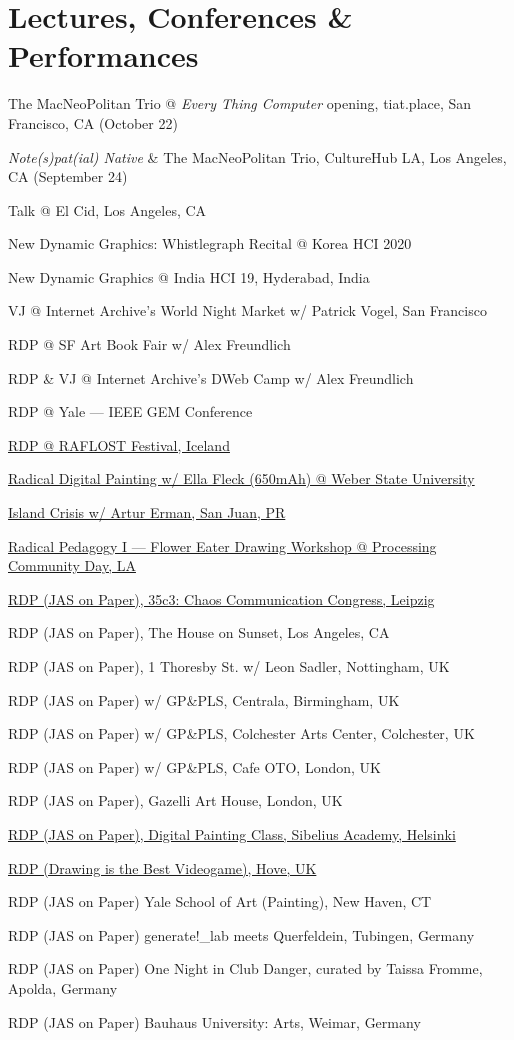 \documentclass[10pt,letterpaper]{article}
\newlength{\cvyearwidth}
\newenvironment{cvlist}{%
  \begin{list}{}{%
    \setlength{\leftmargin}{\cvyearwidth}%
    \setlength{\labelwidth}{\cvyearwidth}%
    \setlength{\labelsep}{0.4em}%
    \setlength{\itemsep}{0.15em}%
    \setlength{\parsep}{0pt}%
    \setlength{\topsep}{0.2em}%
    \renewcommand{\makelabel}[1]{\color{acgray}\small ##1\hfill}%
  }%
}{\end{list}}
\newcommand{\cv}[2]{\item[#1] #2}
\begin{document}
\section*{Lectures, Conferences \& Performances}
\begin{cvlist}
  \cv{2026}{The MacNeoPolitan Trio @ \emph{Every Thing Computer} opening, tiat.place, San Francisco, CA (October 22)}
  \cv{2026}{\emph{Note(s)pat(ial) Native} \& The MacNeoPolitan Trio, CultureHub LA, Los Angeles, CA (September 24)}
  \cv{2025}{Talk @ El Cid, Los Angeles, CA}

  \cv{2020}{New Dynamic Graphics: Whistlegraph Recital @ Korea HCI 2020}
  \cv{2019}{New Dynamic Graphics @ India HCI 19, Hyderabad, India}
  \cv{2019}{VJ @ Internet Archive's World Night Market w/ Patrick Vogel, San Francisco}
  \cv{2019}{RDP @ SF Art Book Fair w/ Alex Freundlich}
  \cv{2019}{RDP \& VJ @ Internet Archive's DWeb Camp w/ Alex Freundlich}
  \cv{2019}{RDP @ Yale --- IEEE GEM Conference}
  \cv{2019}{\href{http://www.raflost.is/jeffrey-alan-scudder}{RDP @ RAFLOST Festival, Iceland}}
  \cv{2019}{\href{https://www.youtube.com/watch?v=xZMsXPgg_9U}{Radical Digital Painting w/ Ella Fleck (650mAh) @ Weber State University}}
  \cv{2019}{\href{https://www.instagram.com/p/BtY342PFPpO}{Island Crisis w/ Artur Erman, San Juan, PR}}
  \cv{2019}{\href{https://day.processing.org/pcd-la-tracks.html}{Radical Pedagogy I --- Flower Eater Drawing Workshop @ Processing Community Day, LA}}
  \cv{2018}{\href{https://media.ccc.de/v/35c3-9774-radical_digital_painting}{RDP (JAS on Paper), 35c3: Chaos Communication Congress, Leipzig}}
  \cv{2018}{RDP (JAS on Paper), The House on Sunset, Los Angeles, CA}
  \cv{2018}{RDP (JAS on Paper), 1 Thoresby St. w/ Leon Sadler, Nottingham, UK}
  \cv{2018}{RDP (JAS on Paper) w/ GP\&PLS, Centrala, Birmingham, UK}
  \cv{2018}{RDP (JAS on Paper) w/ GP\&PLS, Colchester Arts Center, Colchester, UK}
  \cv{2018}{RDP (JAS on Paper) w/ GP\&PLS, Cafe OTO, London, UK}
  \cv{2018}{RDP (JAS on Paper), Gazelli Art House, London, UK}
  \cv{2018}{\href{https://www.youtube.com/watch?v=ndz-co7Xpn8}{RDP (JAS on Paper), Digital Painting Class, Sibelius Academy, Helsinki}}
  \cv{2018}{\href{http://650mah.com/drawing-is-the-best-videogame.html}{RDP (Drawing is the Best Videogame), Hove, UK}}
  \cv{2018}{RDP (JAS on Paper) Yale School of Art (Painting), New Haven, CT}
  \cv{2018}{RDP (JAS on Paper) generate!\_lab meets Querfeldein, Tubingen, Germany}
  \cv{2018}{RDP (JAS on Paper) One Night in Club Danger, curated by Taissa Fromme, Apolda, Germany}
  \cv{2018}{RDP (JAS on Paper) Bauhaus University: Arts, Weimar, Germany}

\end{cvlist}
\end{document}
